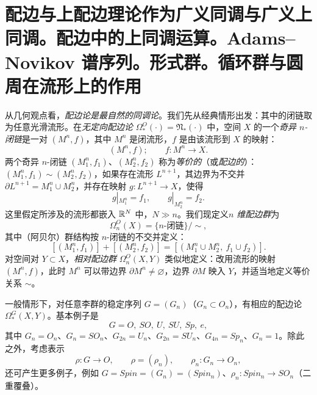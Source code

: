\section[配边与上配边理论。 Adams--Novikov 谱序列。 形式群]{配边与上配边理论作为广义同调与广义上同调。配边中的上同调运算。Adams--Novikov 谱序列。形式群。循环群与圆周在流形上的作用}


从几何观点看，\emph{配边论是最自然的同调论}。我们先从经典情形出发：其中的闭链取为任意光滑流形。在\emph{无定向配边论} $\Omega_*^O(\cdot)=\mathfrak{N}_*(\cdot)$ 中，空间 $X$ 的一个\emph{奇异 $n$-闭链}是一对 $(M^n,f)$，其中 $M^n$ 是闭流形，$f$ 是由该流形到 $X$ 的映射：
\[
(M^n,f);\qquad f:M^n\to X.
\]
两个奇异 $n$-闭链 $(M_1^n,f_1)$、$(M_2^n,f_2)$ 称为\emph{等价的}（或\emph{配边的}）：$(M_1^n,f_1)\sim(M_2^n,f_2)$，如果存在流形 $L^{n+1}$，其边界为不交并 $\partial L^{n+1}=M_1^n\cup M_2^n$，并存在映射 $g:L^{n+1}\to X$，使得
\[
g|_{M_1^n}=f_1,\qquad g|_{M_2^n}=f_2.
\]
这里假定所涉及的流形都嵌入 $\mathbb{R}^N$ 中，$N\gg n$。我们现定义\emph{$n$ 维配边群}为
\[
\Omega_n^O(X)=\{n\text{-闭链}\}/\sim,
\]
其中（阿贝尔）群结构按 $n$-闭链的不交并定义：
\[
[(M_1^n,f_1)]+[(M_2^n,f_2)]=[(M_1^n\cup M_2^n,\ f_1\cup f_2)].
\]
对空间对 $Y\subset X$，\emph{相对配边群} $\Omega_n^O(X,Y)$ 类似地定义：改用流形的映射 $(M^n,f)$，此时 $M^n$ 可以带边界 $\partial M^n\ne\varnothing$，边界 $\partial M$ 映入 $Y$，并适当地定义等价关系 $\sim$。

一般情形下，对任意李群的稳定序列 $G=(G_n)$（$G_n\subset O_n$），有相应的配边论 $\Omega_*^G(X,Y)$。基本例子是
\[
G=O,\ SO,\ U,\ SU,\ Sp,\ e,
\]
其中 $G_n=O_n$、$G_n=SO_n$、$G_{2n}=U_n$、$G_{2n}=SU_n$、$G_{4n}=Sp_n$、$G_n=1$。除此之外，考虑表示
\[
\rho:G\to O,\qquad \rho=(\rho_n),\qquad \rho_n:G_n\to O_n,
\]
还可产生更多例子，例如 $G=Spin=(G_n)=(Spin_n)$、$\rho_n:Spin_n\to SO_n$（二重覆叠）。

